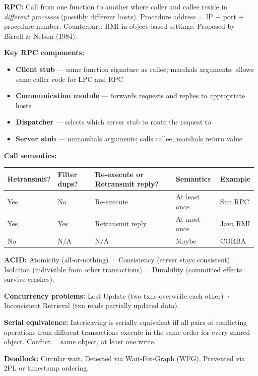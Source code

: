 \documentclass[11pt,a4paper]{article}
\newcommand{\key}[1]{\textbf{\textcolor{keyred}{#1}}}
\begin{document}
\begin{refbox}
\textbf{RPC:} Call from one function to another where caller and callee reside in \emph{different processes} (possibly different hosts). Procedure address = IP + port + procedure number. Counterpart: RMI in object-based settings. Proposed by Birrell \& Nelson (1984).

\textbf{Key RPC components:}
\begin{itemize}
  \item \key{Client stub} --- same function signature as callee; marshals arguments; allows same caller code for LPC and RPC
  \item \key{Communication module} --- forwards requests and replies to appropriate hosts
  \item \key{Dispatcher} --- selects which server stub to route the request to
  \item \key{Server stub} --- unmarshals arguments; calls callee; marshals return value
\end{itemize}

\textbf{Call semantics:}
\begin{center}
\begin{tabular}{lllll}
\toprule
Retransmit? & Filter dups? & Re-execute or Retransmit reply? & Semantics & Example \\
\midrule
Yes & No & Re-execute & At least once & Sun RPC \\
Yes & Yes & Retransmit reply & At most once & Java RMI \\
No & N/A & N/A & Maybe & CORBA \\
\bottomrule
\end{tabular}
\end{center}

\textbf{ACID:} Atomicity (all-or-nothing) · Consistency (server stays consistent) · Isolation (indivisible from other transactions) · Durability (committed effects survive crashes).

\textbf{Concurrency problems:} Lost Update (two txns overwrite each other) · Inconsistent Retrieval (txn reads partially updated data).

\textbf{Serial equivalence:} Interleaving is serially equivalent iff all pairs of conflicting operations from different transactions execute in the same order for every shared object. Conflict = same object, at least one write.

\textbf{Deadlock:} Circular wait. Detected via Wait-For-Graph (WFG). Prevented via 2PL or timestamp ordering.
\end{refbox}
\end{document}
